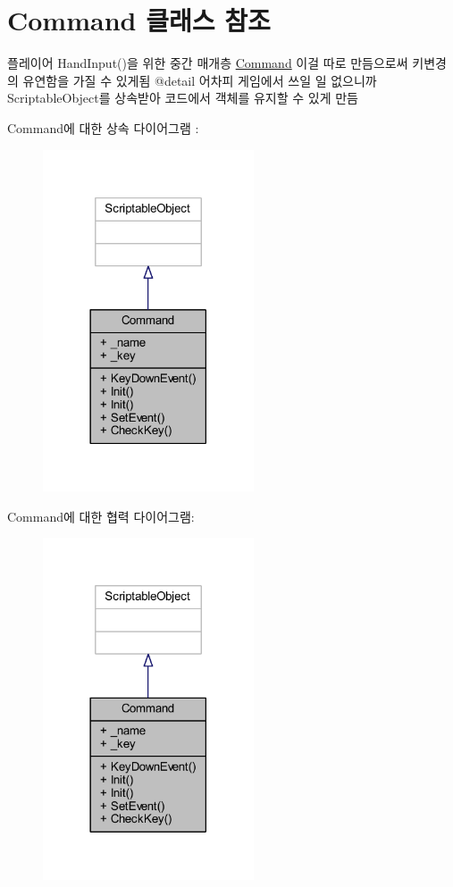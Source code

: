 \hypertarget{class_command}{}\section{Command 클래스 참조}
\label{class_command}


플레이어 Hand\+Input()을 위한 중간 매개층 \mbox{\hyperlink{class_command}{Command}} 이걸 따로 만듬으로써 키변경의 유연함을 가질 수 있게됨 @detail 어차피 게임에서 쓰일 일 없으니까 Scriptable\+Object를 상속받아 코드에서 객체를 유지할 수 있게 만듬  




Command에 대한 상속 다이어그램 \+: \nopagebreak
\begin{figure}[H]
\begin{center}
\leavevmode
\includegraphics[width=177pt]{d8/ddd/class_command__inherit__graph}
\end{center}
\end{figure}


Command에 대한 협력 다이어그램\+:\nopagebreak
\begin{figure}[H]
\begin{center}
\leavevmode
\includegraphics[width=177pt]{db/dd2/class_command__coll__graph}
\end{center}
\end{figure}
